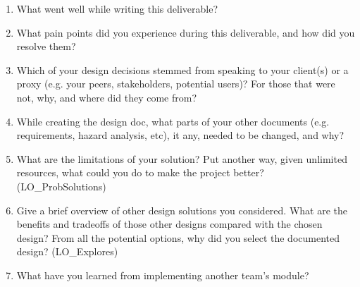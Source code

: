 \documentclass[12pt, titlepage]{article}
\begin{document}




\begin{enumerate}
  \item What went well while writing this deliverable? 
  \item What pain points did you experience during this deliverable, and how
    did you resolve them?
  \item Which of your design decisions stemmed from speaking to your client(s)
  or a proxy (e.g. your peers, stakeholders, potential users)? For those that
  were not, why, and where did they come from?
  \item While creating the design doc, what parts of your other documents (e.g.
  requirements, hazard analysis, etc), it any, needed to be changed, and why?
  \item What are the limitations of your solution?  Put another way, given
  unlimited resources, what could you do to make the project better? (LO\_ProbSolutions)
  \item Give a brief overview of other design solutions you considered.  What
  are the benefits and tradeoffs of those other designs compared with the chosen
  design?  From all the potential options, why did you select the documented design?
  (LO\_Explores)
  \item What have you learned from implementing another team's module?
\end{enumerate}
\end{document}
